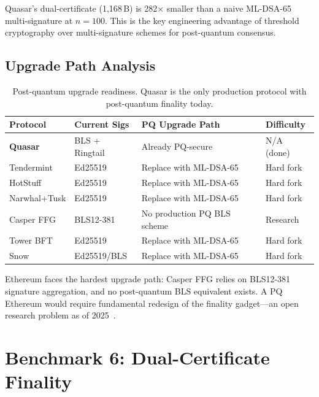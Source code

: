 \documentclass[11pt]{article}
\begin{document}
Quasar's dual-certificate (1{,}168\,B) is 282$\times$ smaller than a naive ML-DSA-65
multi-signature at $n=100$. This is the key engineering advantage of threshold
cryptography over multi-signature schemes for post-quantum consensus.

\subsection{Upgrade Path Analysis}

\begin{table}[h]
\centering
\small
\begin{tabular}{@{}llll@{}}
\toprule
\textbf{Protocol} & \textbf{Current Sigs} & \textbf{PQ Upgrade Path} & \textbf{Difficulty} \\
\midrule
\textbf{Quasar}   & BLS + Ringtail & Already PQ-secure           & N/A (done) \\
Tendermint        & Ed25519        & Replace with ML-DSA-65       & Hard fork \\
HotStuff          & Ed25519        & Replace with ML-DSA-65       & Hard fork \\
Narwhal+Tusk      & Ed25519        & Replace with ML-DSA-65       & Hard fork \\
Casper FFG        & BLS12-381      & No production PQ BLS scheme  & Research \\
Tower BFT         & Ed25519        & Replace with ML-DSA-65       & Hard fork \\
Snow              & Ed25519/BLS    & Replace with ML-DSA-65       & Hard fork \\
\bottomrule
\end{tabular}
\caption{Post-quantum upgrade readiness. Quasar is the only production protocol with
post-quantum finality today.}
\label{tab:pq-readiness}
\end{table}

Ethereum faces the hardest upgrade path: Casper FFG relies on BLS12-381 signature
aggregation, and no post-quantum BLS equivalent exists. A PQ Ethereum would require
fundamental redesign of the finality gadget---an open research problem as of
2025~\cite{ethereum-pq}.

\section{Benchmark 6: Dual-Certificate Finality}
\label{sec:dual-cert}
\end{document}
